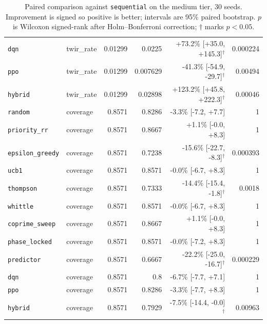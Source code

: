 \begin{table}[t]
\begin{tabular}{llrrrr}
    \texttt{dqn} & twir\_rate & 0.01299 & 0.0225 & +73.2\% [+35.0, +145.3]$^{\dagger}$ & 0.000224 \\
    \texttt{ppo} & twir\_rate & 0.01299 & 0.007629 & -41.3\% [-54.9, -29.7]$^{\dagger}$ & 0.00494 \\
    \texttt{hybrid} & twir\_rate & 0.01299 & 0.02898 & +123.2\% [+45.8, +222.3]$^{\dagger}$ & 0.00046 \\
    \midrule
    \texttt{random} & coverage & 0.8571 & 0.8286 & -3.3\% [-7.2, +7.7] & 1 \\
    \texttt{priority\_rr} & coverage & 0.8571 & 0.8667 & +1.1\% [-0.0, +8.3] & 1 \\
    \texttt{epsilon\_greedy} & coverage & 0.8571 & 0.7238 & -15.6\% [-22.7, -8.3]$^{\dagger}$ & 0.000393 \\
    \texttt{ucb1} & coverage & 0.8571 & 0.8571 & -0.0\% [-6.7, +8.3] & 1 \\
    \texttt{thompson} & coverage & 0.8571 & 0.7333 & -14.4\% [-15.4, -1.8]$^{\dagger}$ & 0.0018 \\
    \texttt{whittle} & coverage & 0.8571 & 0.8571 & -0.0\% [-6.7, +8.3] & 1 \\
    \texttt{coprime\_sweep} & coverage & 0.8571 & 0.8667 & +1.1\% [-0.0, +8.3] & 1 \\
    \texttt{phase\_locked} & coverage & 0.8571 & 0.8571 & -0.0\% [-7.2, +8.3] & 1 \\
    \texttt{predictor} & coverage & 0.8571 & 0.6667 & -22.2\% [-25.0, -16.7]$^{\dagger}$ & 0.000229 \\
    \texttt{dqn} & coverage & 0.8571 & 0.8 & -6.7\% [-7.7, +7.1] & 1 \\
    \texttt{ppo} & coverage & 0.8571 & 0.8286 & -3.3\% [-7.7, +8.3] & 1 \\
    \texttt{hybrid} & coverage & 0.8571 & 0.7929 & -7.5\% [-14.4, -0.0]$^{\dagger}$ & 0.00963 \\
    \bottomrule
  \end{tabular}
  \caption{Paired comparison against \texttt{sequential} on the medium tier, 30 seeds. Improvement is signed so positive is better; intervals are 95\% paired bootstrap. $p$ is Wilcoxon signed-rank after Holm--Bonferroni correction; $\dagger$ marks $p < 0.05$.}
  \label{tab:leaderboard-medium}
\end{table}

